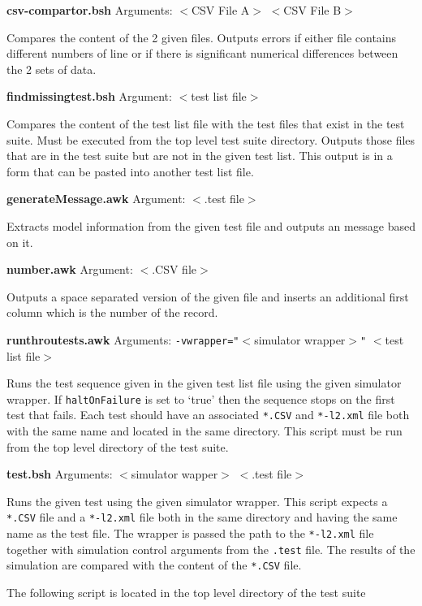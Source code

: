 \documentclass{cekarticle}
\begin{document}
\textbf{csv-compartor.bsh} Arguments: $<$CSV File A$>$ $<$CSV File
B$>$

Compares the content of the 2 given files.  Outputs errors if
either file contains different numbers of line or if there is
significant numerical differences between the 2 sets of data.

\textbf{findmissingtest.bsh} Argument: $<$test list file$>$

Compares the content of the test list file with the test files
that exist in the test suite.  Must be executed from the top level
test suite directory.  Outputs those files that are in the test
suite but are not in the given test list.  This output is in a
form that can be pasted into another test list file.

\textbf{generateMessage.awk} Argument: $<$.test file$>$

Extracts model information from the given test file and outputs an
message based on it.

\textbf{number.awk} Argument: $<$.CSV file$>$

Outputs a space separated version of the given file and inserts an
additional first column which is the number of the record.

\textbf{runthroutests.awk} Arguments:
\texttt{-vwrapper="}$<$simulator wrapper$>$\texttt{"} \newline
[\texttt{-vhaltOnFailure="}$<$boolean value$>$\texttt{"}] $<$test
list file$>$

Runs the test sequence given in the given test list file using the
given simulator wrapper.  If \texttt{haltOnFailure} is set to
`true' then the sequence stops on the first test that fails.  Each
test should have an associated \texttt{*.CSV} and
\texttt{*-l2.xml} file both with the same name and located in the
same directory. This script must be run from the top level
directory of the test suite.

\textbf{test.bsh} Arguments: $<$simulator wapper$>$ $<$.test
file$>$

Runs the given test using the given simulator wrapper.  This
script expects a \texttt{*.CSV} file and a \texttt{*-l2.xml} file
both in the same directory and having the same name as the test
file.  The wrapper is passed the path to the \texttt{*-l2.xml}
file together with simulation control arguments from the
\texttt{.test} file.  The results of the simulation are compared
with the content of the \texttt{*.CSV} file.

The following script is located in the top level directory of the
test suite
\end{document}
